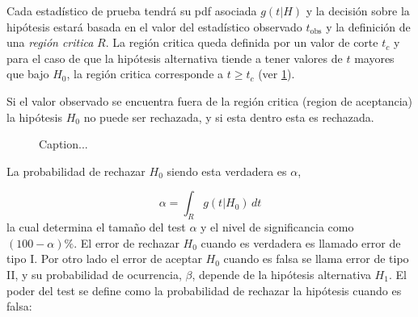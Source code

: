 Cada estadístico de prueba tendrá su pdf asociada $g(t|H)$ y la decisión sobre
la hipótesis estará basada en el valor del estadístico observado $t_\text{obs}$
y la definición de una \emph{región critica} $R$.
La región critica queda definida por un valor de corte $t_c$ y para el caso de
que la hipótesis alternativa tiende a tener valores de $t$ mayores que bajo
$H_0$, la región critica corresponde a $t \geq t_c$ (ver \cref{fig:stat_test}).

Si el valor observado se encuentra fuera de la región critica (region de
aceptancia) la hipótesis $H_0$ no puede ser rechazada, y si esta dentro esta es
rechazada.

\begin{figure}[h]
  \centering
  
  \caption{Caption...}
  \label{fig:stat_test}
\end{figure}





La probabilidad de rechazar $H_0$ siendo esta verdadera es $\alpha$,

\begin{equation}
  \alpha = \int_{R} g(t|H_0)\, dt
\end{equation}
%
la cual determina el tama\~no del test $\alpha$ y el nivel de significancia como
$(100 - \alpha) \%$. El error de rechazar $H_0$ cuando es verdadera es llamado
error de tipo I. Por otro lado el error de aceptar $H_0$ cuando es falsa se
llama error de tipo II, y su probabilidad de ocurrencia, $\beta$, depende de la
hipótesis alternativa $H_1$. El poder del test se define como la probabilidad de
rechazar la hipótesis cuando es falsa:

